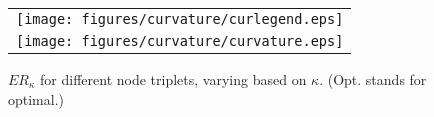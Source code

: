 \begin{wrapfigure}{R}{0.4\textwidth}
\centering
\vspace{-6mm}

\vspace{-3mm}
\begin{small}
\begin{tabular}{c}
\vspace{-3mm}
\texttt{[image: figures/curvature/curlegend.eps]}  \\ [-2mm]
    \texttt{[image: figures/curvature/curvature.eps]}
\end{tabular}
\vspace{-5mm}
\caption{$ER_\kappa$ for different node triplets, varying based on $\kappa$. (Opt. stands for optimal.) }
\label{fig:curvature}
\vspace{-3mm}
\end{small}
\end{wrapfigure}
